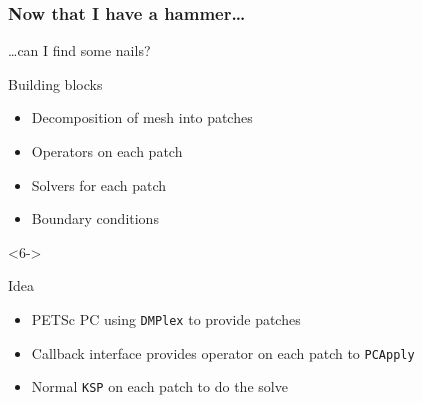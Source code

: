 \documentclass[presentation,aspectratio=43]{beamer}
\begin{document}
\begin{frame}
  \frametitle{Now that I have a hammer\ldots}
  \ldots can I find some nails?
  \begin{block}{Building blocks}
    \begin{itemize}
    \item Decomposition of mesh into patches
    \item Operators on each patch
    \item Solvers for each patch
    \item Boundary conditions
    \end{itemize}
  \end{block}
  \begin{uncoverenv}<6->
    \begin{block}{Idea}
      \begin{itemize}
      \item PETSc PC using \texttt{DMPlex} to provide patches
      \item Callback interface provides operator on each patch to
        \texttt{PCApply}
      \item Normal \texttt{KSP} on each patch to do the solve
      \end{itemize}
    \end{block}
  \end{uncoverenv}
\end{frame}
\end{document}
